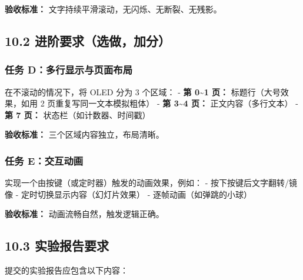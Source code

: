 \documentclass[
  chinese,
  UTF8,
  oneside,
  openany]{ctexbook}
\begin{document}
\textbf{验收标准：} 文字持续平滑滚动，无闪烁、无断裂、无残影。

\subsection{10.2
进阶要求（选做，加分）}\label{ux8fdbux9636ux8981ux6c42ux9009ux505aux52a0ux5206}

\subsubsection{任务
D：多行显示与页面布局}\label{ux4efbux52a1-dux591aux884cux663eux793aux4e0eux9875ux9762ux5e03ux5c40}

在不滚动的情况下，将 OLED 分为 3 个区域： - \textbf{第 0\textasciitilde1
页：} 标题行（大号效果，如用 2 页重复写同一文本模拟粗体） - \textbf{第
3\textasciitilde4 页：} 正文内容（多行文本） - \textbf{第 7 页：}
状态栏（如计数器、时间戳）

\textbf{验收标准：} 三个区域内容独立，布局清晰。

\subsubsection{任务
E：交互动画}\label{ux4efbux52a1-eux4ea4ux4e92ux52a8ux753b}

实现一个由按键（或定时器）触发的动画效果，例如： -
按下按键后文字翻转/镜像 - 定时切换显示内容（幻灯片效果） -
逐帧动画（如弹跳的小球）

\textbf{验收标准：} 动画流畅自然，触发逻辑正确。

\subsection{10.3
实验报告要求}\label{ux5b9eux9a8cux62a5ux544aux8981ux6c42-1}

提交的实验报告应包含以下内容：
\end{document}
